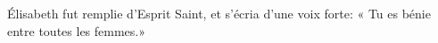 \encetemps Élisabeth fut remplie d’Esprit Saint,
	et s’écria d’une voix forte:
	« Tu es bénie entre toutes les femmes.»
